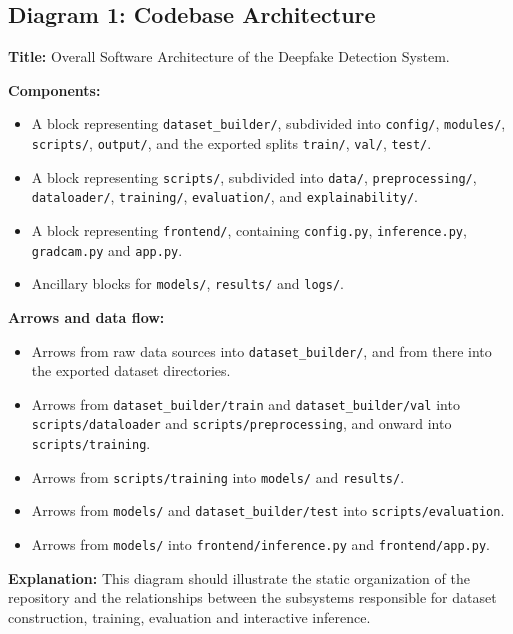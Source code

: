 \subsection*{Diagram 1: Codebase Architecture}

\textbf{Title:} Overall Software Architecture of the Deepfake Detection System.

\textbf{Components:}
\begin{itemize}
  \item A block representing \texttt{dataset\_builder/}, subdivided into \texttt{config/}, \texttt{modules/}, \texttt{scripts/}, \texttt{output/}, and the exported splits \texttt{train/}, \texttt{val/}, \texttt{test/}.
  \item A block representing \texttt{scripts/}, subdivided into \texttt{data/}, \texttt{preprocessing/}, \texttt{dataloader/}, \texttt{training/}, \texttt{evaluation/}, and \texttt{explainability/}.
  \item A block representing \texttt{frontend/}, containing \texttt{config.py}, \texttt{inference.py}, \texttt{gradcam.py} and \texttt{app.py}.
  \item Ancillary blocks for \texttt{models/}, \texttt{results/} and \texttt{logs/}.
\end{itemize}

\textbf{Arrows and data flow:}
\begin{itemize}
  \item Arrows from raw data sources into \texttt{dataset\_builder/}, and from there into the exported dataset directories.
  \item Arrows from \texttt{dataset\_builder/train} and \texttt{dataset\_builder/val} into \texttt{scripts/dataloader} and \texttt{scripts/preprocessing}, and onward into \texttt{scripts/training}.
  \item Arrows from \texttt{scripts/training} into \texttt{models/} and \texttt{results/}.
  \item Arrows from \texttt{models/} and \texttt{dataset\_builder/test} into \texttt{scripts/evaluation}.
  \item Arrows from \texttt{models/} into \texttt{frontend/inference.py} and \texttt{frontend/app.py}.
\end{itemize}

\textbf{Explanation:} This diagram should illustrate the static organization of the repository and the relationships between the subsystems responsible for dataset construction, training, evaluation and interactive inference.

